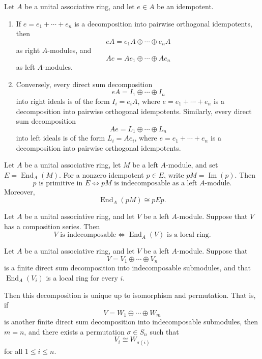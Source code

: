 \begin{theorem} \label{thm:idempotents-and-ideal-decompositions} 
    Let \(A\) be a unital associative ring, and let \(e\in A\) be an idempotent. 
    \begin{enumerate} 
        \item[(i)] If \(e=e_1+\cdots+e_n\) is a decomposition into pairwise orthogonal idempotents, then \[ eA=e_1A\oplus\cdots\oplus e_nA \] as right \(A\)-modules, and \[ Ae=Ae_1\oplus\cdots\oplus Ae_n \] as left \(A\)-modules. 
        \item[(ii)] Conversely, every direct sum decomposition \[ eA=I_1\oplus\cdots\oplus I_n \] into right ideals is of the form \(I_i=e_iA\), where \(e=e_1+\cdots+e_n\) is a decomposition into pairwise orthogonal idempotents. Similarly, every direct sum decomposition \[ Ae=L_1\oplus\cdots\oplus L_n \] into left ideals is of the form \(L_i=Ae_i\), where \(e=e_1+\cdots+e_n\) is a decomposition into pairwise orthogonal idempotents. 
    \end{enumerate} 
\end{theorem}


\begin{theorem}
\label{thm:primitive-idempotents-for-modules}
Let \(A\) be a unital associative ring, let \(M\) be a left \(A\)-module, and
set \(E=\operatorname{End}_A(M)\). For a nonzero idempotent \(p\in E\), write
\(pM=\operatorname{Im}(p)\). Then
\[
p \text{ is primitive in } E
\Longleftrightarrow
pM \text{ is indecomposable as a left } A\text{-module}.
\]
Moreover,
\[
\operatorname{End}_A(pM)\cong pEp .
\]
\end{theorem}


\begin{theorem}
\label{thm:indecomposable-local-endomorphism-ring}
Let \(A\) be a unital associative ring, and let \(V\) be a left
\(A\)-module. Suppose that \(V\) has a composition series. Then
\[
V \text{ is indecomposable}
\Longleftrightarrow
\operatorname{End}_A(V) \text{ is a local ring}.
\]
\end{theorem}

\begin{theorem}
\label{thm:krull-schmidt-azumaya}
Let \(A\) be a unital associative ring, and let \(V\) be a left
\(A\)-module. Suppose that
\[
V=V_1\oplus\cdots\oplus V_n
\]
is a finite direct sum decomposition into indecomposable submodules, and that
\(\operatorname{End}_A(V_i)\) is a local ring for every \(i\).

Then this decomposition is unique up to isomorphism and permutation. That is,
if
\[
V=W_1\oplus\cdots\oplus W_m
\]
is another finite direct sum decomposition into indecomposable submodules,
then \(m=n\), and there exists a permutation \(\sigma\in S_n\) such that
\[
V_i\cong W_{\sigma(i)}
\]
for all \(1\leq i\leq n\).
\end{theorem}



